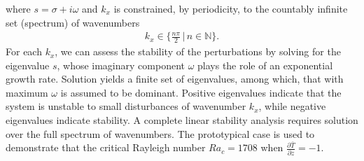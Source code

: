 \documentclass[reprint,amsmath,amssymb,aps]{revtex4-1}
\begin{document}
where $s = \sigma + i\omega$ and $k_x$ is constrained, by periodicity, to the countably infinite set (spectrum) of wavenumbers
\begin{align}
    k_x \in \big\{\frac{n\pi}{2} \, \big| \, n \in \mathbb{N}\big\}.
\end{align}
For each $k_x$, we can assess the stability of the perturbations by solving for the eigenvalue $s$, whose imaginary component $\omega$ plays the role of an exponential growth rate. 
Solution yields a finite set of eigenvalues, among which, that with maximum $\omega$ is assumed to be dominant. 
Positive eigenvalues indicate that the system is unstable to small disturbances of wavenumber $k_x$, while negative eigenvalues indicate stability. 
A complete linear stability analysis requires solution over the full spectrum of wavenumbers. 
The prototypical case is used to demonstrate that the critical Rayleigh number $Ra_c = 1708$ when $\frac{\partial \bar{T}}{\partial z} = -1$.
\end{document}

